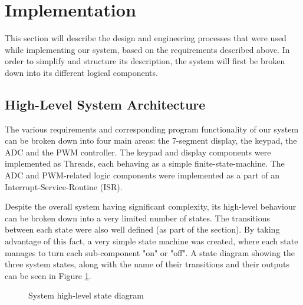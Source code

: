 \section{Implementation}

This section will describe the design and engineering processes that were used while implementing our system, based on the requirements described above. In order to simplify and structure its description, the system will first be broken down into its different logical components.


\subsection{High-Level System Architecture}


The various requirements and corresponding program functionality of our system can be broken down into four main areas: the 7-segment display, the keypad, the ADC and the PWM controller. The keypad and display components were implemented as Threads, each behaving as a simple finite-state-machine. The ADC and PWM-related logic components were implemented as a part of an Interrupt-Service-Routine (ISR).


Despite the overall system having significant complexity, its high-level behaviour can be broken down into a very limited number of states. The transitions between each state were also well defined (as part of the  section). By taking advantage of this fact, a very simple state machine was created, where each state manages to turn each sub-component "on" or "off". A state diagram showing the three system states, along with the name of their transitions and their outputs can be seen in Figure \ref{fig:high-level-state-diagram}.


\begin{figure}[h]
\centering
{}
\caption{System high-level state diagram}
\label{fig:high-level-state-diagram}
\end{figure}




